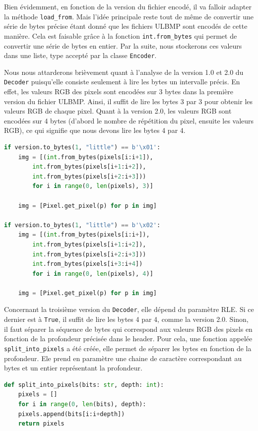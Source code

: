 \documentclass[utf8]{article}
\begin{document}
Bien évidemment, en fonction de la version du fichier encodé, il va falloir adapter la méthode \texttt{load_from}. Mais l'idée principale reste tout de même de convertir une série de bytes précise étant donné que les fichiers ULBMP sont encodés de cette manière. Cela est faisable grâce à la fonction \texttt{int.from_bytes} qui permet de convertir une série de bytes en entier. Par la suite, nous stockerons ces valeurs dans une liste, type accepté par la classe \texttt{Encoder}.


Nous nous attarderons brièvement quant à l'analyse de la version 1.0 et 2.0 du \texttt{Decoder} puisqu'elle consiste seulement à lire les bytes un intervalle précis. En effet, les valeurs RGB des pixels sont encodées sur 3 bytes dans la première version du fichier ULBMP. Ainsi, il suffit de lire les bytes 3 par 3 pour obtenir les valeurs RGB de chaque pixel. Quant à la version 2.0, les valeurs RGB sont encodées sur 4 bytes (d'abord le nombre de répétition du pixel, ensuite les valeurs RGB), ce qui signifie que nous devons lire les bytes 4 par 4.

\begin{lstlisting}[language=Python, basicstyle=\small]
if version.to_bytes(1, "little") == b'\x01':
	img = [(int.from_bytes(pixels[i:i+1]), 
		int.from_bytes(pixels[i+1:i+2]), 
		int.from_bytes(pixels[i+2:i+3])) 
		for i in range(0, len(pixels), 3)]

	img = [Pixel.get_pixel(p) for p in img]

if version.to_bytes(1, "little") == b'\x02':
	img = [(int.from_bytes(pixels[i:i+]), 
		int.from_bytes(pixels[i+1:i+2]),
		int.from_bytes(pixels[i+2:i+3]))
		int.from_bytes(pixels[i+3:i+4])
		for i in range(0, len(pixels), 4)]
	 
	img = [Pixel.get_pixel(p) for p in img]
\end{lstlisting}

Concernant la troisième version du \texttt{Decoder}, elle dépend du paramètre RLE. Si ce dernier est à \texttt{True}, il suffit de lire les bytes 4 par 4, comme la version 2.0. Sinon, il faut séparer la séquence de bytes qui correspond aux valeurs RGB des pixels en fonction de la profondeur précisée dans le header. Pour cela, une fonction appelée \texttt{split_into_pixels} a été créée, elle permet de séparer les bytes en fonction de la profondeur. Ele prend en paramètre une chaine de caractère correspondant au bytes et un entier représentant la profondeur.

\begin{lstlisting}[language=Python, basicstyle=\small]
def split_into_pixels(bits: str, depth: int):
    pixels = []
    for i in range(0, len(bits), depth):
	pixels.append(bits[i:i+depth])
    return pixels
\end{lstlisting}
\end{document}
